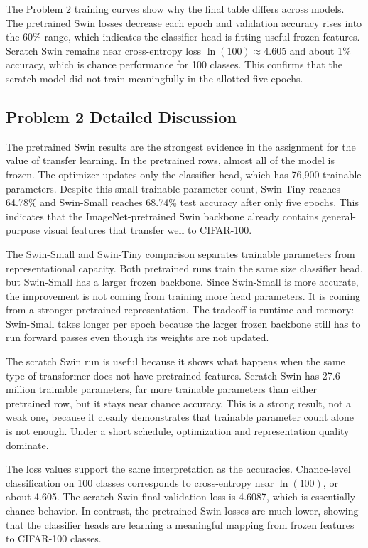 \documentclass[11pt]{article}
\begin{document}
The Problem 2 training curves show why the final table differs across models. The pretrained Swin losses decrease each epoch and validation accuracy rises into the 60\% range, which indicates the classifier head is fitting useful frozen features. Scratch Swin remains near cross-entropy loss $\ln(100) \approx 4.605$ and about 1\% accuracy, which is chance performance for 100 classes. This confirms that the scratch model did not train meaningfully in the allotted five epochs.

\subsection*{Problem 2 Detailed Discussion}
The pretrained Swin results are the strongest evidence in the assignment for the value of transfer learning. In the pretrained rows, almost all of the model is frozen. The optimizer updates only the classifier head, which has 76,900 trainable parameters. Despite this small trainable parameter count, Swin-Tiny reaches 64.78\% and Swin-Small reaches 68.74\% test accuracy after only five epochs. This indicates that the ImageNet-pretrained Swin backbone already contains general-purpose visual features that transfer well to CIFAR-100.

The Swin-Small and Swin-Tiny comparison separates trainable parameters from representational capacity. Both pretrained runs train the same size classifier head, but Swin-Small has a larger frozen backbone. Since Swin-Small is more accurate, the improvement is not coming from training more head parameters. It is coming from a stronger pretrained representation. The tradeoff is runtime and memory: Swin-Small takes longer per epoch because the larger frozen backbone still has to run forward passes even though its weights are not updated.

The scratch Swin run is useful because it shows what happens when the same type of transformer does not have pretrained features. Scratch Swin has 27.6 million trainable parameters, far more trainable parameters than either pretrained row, but it stays near chance accuracy. This is a strong result, not a weak one, because it cleanly demonstrates that trainable parameter count alone is not enough. Under a short schedule, optimization and representation quality dominate.

The loss values support the same interpretation as the accuracies. Chance-level classification on 100 classes corresponds to cross-entropy near $\ln(100)$, or about 4.605. The scratch Swin final validation loss is 4.6087, which is essentially chance behavior. In contrast, the pretrained Swin losses are much lower, showing that the classifier heads are learning a meaningful mapping from frozen features to CIFAR-100 classes.
\end{document}
